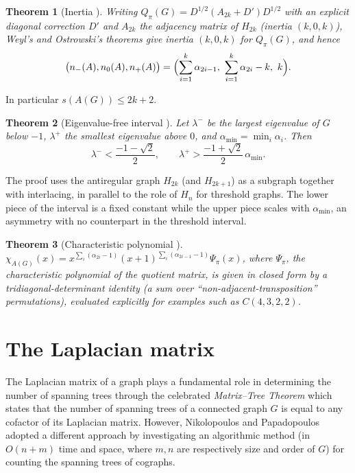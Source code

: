 \documentclass[11pt]{article}
\theoremstyle{plain}
\newtheorem{theorem}{Theorem}[section]
\theoremstyle{definition}
\theoremstyle{remark}
\begin{document}
	\begin{theorem}[Inertia \cite{MandalMehatari2025}]
		\label{thm:cgraph-inertia}
		Writing $Q_\pi(G)=D^{1/2}(A_{2k}+D')D^{1/2}$ with an explicit diagonal correction $D'$ and $A_{2k}$ the adjacency matrix of $H_{2k}$ (inertia $(k,0,k)$), Weyl's and Ostrowski's theorems give inertia $(k,0,k)$ for $Q_\pi(G)$, and hence
		\[
		\bigl(n_-(A),n_0(A),n_+(A)\bigr)=\Bigl(\sum_{i=1}^k\alpha_{2i-1},\ \sum_{i=1}^k\alpha_{2i}-k,\ k\Bigr).
		\]
	\end{theorem}
	
	In particular $s(A(G))\le2k+2$.
	
	\begin{theorem}[Eigenvalue-free interval \cite{MandalMehatari2025}]
		\label{thm:cgraph-eigfree}
		Let $\lambda^-$ be the largest eigenvalue of $G$ below $-1$, $\lambda^+$ the smallest eigenvalue above $0$, and $\alpha_{\min}=\min_i\alpha_i$. Then
		\[
		\lambda^-<\frac{-1-\sqrt2}{2},\qquad \lambda^+>\frac{-1+\sqrt2}{2}\,\alpha_{\min}.
		\]
	\end{theorem}
	
	The proof uses the antiregular graph $H_{2k}$ (and $H_{2k+1}$) as a subgraph together with interlacing, in parallel to the role of $H_n$ for threshold graphs. The lower piece of the interval is a fixed constant while the upper piece scales with $\alpha_{\min}$, an asymmetry with no counterpart in the threshold interval.
	
	\begin{theorem}[Characteristic polynomial \cite{MandalMehatari2025}]
		\label{thm:cgraph-charpoly}
		$\chi_{A(G)}(x)=x^{\sum_i(\alpha_{2i}-1)}(x+1)^{\sum_i(\alpha_{2i-1}-1)}\Psi_\pi(x)$, where $\Psi_\pi$, the characteristic polynomial of the quotient matrix, is given in closed form by a tridiagonal-determinant identity (a sum over ``non-adjacent-transposition'' permutations), evaluated explicitly for examples such as $C(4,3,2,2)$.
	\end{theorem}
	
	
	\section{The Laplacian matrix}
	\label{sec:laplacian}
	The Laplacian matrix of a graph plays a fundamental role in determining the number of spanning trees through the celebrated \emph{Matrix–Tree Theorem} which states that the number of spanning trees of a connected graph $G$ is equal to any cofactor of its Laplacian matrix. However, Nikolopoulos and Papadopoulos \cite{Nikolopoulos2009} adopted a different approach by investigating an algorithmic method (in $O(n+m)$
	time and space, where $m,n$ are respectively size and order of $G$) for counting the spanning trees of cographs.
	
\end{document}
